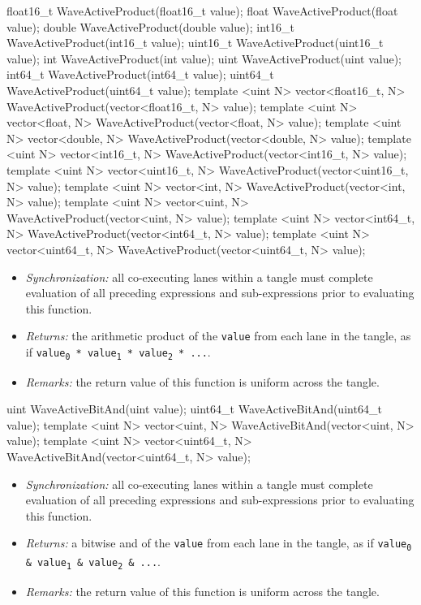 \begin{HLSL}
float16_t WaveActiveProduct(float16_t value);
float WaveActiveProduct(float value);
double WaveActiveProduct(double value);
int16_t WaveActiveProduct(int16_t value);
uint16_t WaveActiveProduct(uint16_t value);
int WaveActiveProduct(int value);
uint WaveActiveProduct(uint value);
int64_t WaveActiveProduct(int64_t value);
uint64_t WaveActiveProduct(uint64_t value);
template <uint N> vector<float16_t, N> WaveActiveProduct(vector<float16_t, N> value);
template <uint N> vector<float, N> WaveActiveProduct(vector<float, N> value);
template <uint N> vector<double, N> WaveActiveProduct(vector<double, N> value);
template <uint N> vector<int16_t, N> WaveActiveProduct(vector<int16_t, N> value);
template <uint N> vector<uint16_t, N> WaveActiveProduct(vector<uint16_t, N> value);
template <uint N> vector<int, N> WaveActiveProduct(vector<int, N> value);
template <uint N> vector<uint, N> WaveActiveProduct(vector<uint, N> value);
template <uint N> vector<int64_t, N> WaveActiveProduct(vector<int64_t, N> value);
template <uint N> vector<uint64_t, N> WaveActiveProduct(vector<uint64_t, N> value);
\end{HLSL}

\begin{itemize}
  \item \textit{Synchronization:} all co-executing \gls{lane}s within a \gls{tangle}
  must complete evaluation of all preceding expressions and sub-expressions
  prior to evaluating this function.
  \item \textit{Returns:} the arithmetic product of the \texttt{value} from each
  \gls{lane} in the \gls{tangle}, as if \texttt{value\textsubscript{0} *
  value\textsubscript{1} * value\textsubscript{2} * ...}.
  \item \textit{Remarks:} the return value of this function is uniform across
  the \gls{tangle}.
\end{itemize}

\begin{HLSL}
uint WaveActiveBitAnd(uint value);
uint64_t WaveActiveBitAnd(uint64_t value);
template <uint N> vector<uint, N> WaveActiveBitAnd(vector<uint, N> value);
template <uint N> vector<uint64_t, N> WaveActiveBitAnd(vector<uint64_t, N> value);
\end{HLSL}

\begin{itemize}
  \item \textit{Synchronization:} all co-executing \gls{lane}s within a \gls{tangle}
  must complete evaluation of all preceding expressions and sub-expressions
  prior to evaluating this function.
  \item \textit{Returns:} a bitwise and of the \texttt{value} from each
  \gls{lane} in the \gls{tangle}, as if \texttt{value\textsubscript{0} \&
  value\textsubscript{1} \& value\textsubscript{2} \& ...}.
  \item \textit{Remarks:} the return value of this function is uniform across
  the \gls{tangle}.
\end{itemize}

